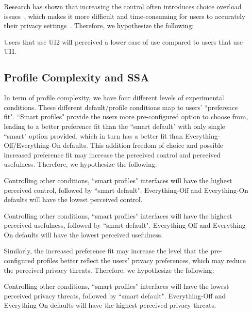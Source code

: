 Research has shown that increasing the control often introduces choice overload issues~\cite{iyengar2000choice, schwartz2004paradox, acquisti2005privacy, acquisti2007can}, which makes it more difficult and time-consuming for users to accurately their privacy settings~\cite{madejski2012study, sadeh2009understanding}. Therefore, we hypothesize the following:
\begin{theorem}
	Users that use UI2 will perceived a lower ease of use compared to users that use UI1.
\end{theorem}

\subsection{Profile Complexity and SSA}
In term of profile complexity, we have four different levels of experimental conditions. These different default/profile conditions map to users' ``preference fit". ``Smart profiles" provide the users more pre-configured option to choose from, leading to a better preference fit than the ``smart default" with only single ``smart" option provided, which in turn has a better fit than Everything-Off/Everything-On defaults. This addition freedom of choice and possible increased preference fit may increase the perceived control and perceived usefulness. Therefore, we hypothesize the following:
\theoremgroup
\begin{theorem}
	Controlling other conditions, ``smart profiles" interfaces will have the highest perceived control, followed by ``smart default". Everything-Off and Everything-On defaults will have the lowest perceived control.
\end{theorem}
\begin{theorem}
	Controlling other conditions, ``smart profiles" interfaces will have the highest perceived usefulness, followed by ``smart default". Everything-Off and Everything-On defaults will have the lowest perceived usefulness.
\end{theorem}

Similarly, the increased preference fit may increase the level that the pre-configured profiles better reflect the users' privacy preferences, which may reduce the perceived privacy threats. Therefore, we hypothesize the following:
\begin{theorem}
	Controlling other conditions, ``smart profiles" interfaces will have the lowest perceived privacy threats, followed by ``smart default". Everything-Off and Everything-On defaults will have the highest perceived privacy threats.
\end{theorem}

